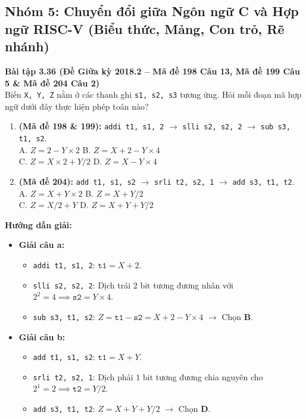 \subsection{Nhóm 5: Chuyển đổi giữa Ngôn ngữ C và Hợp ngữ RISC-V (Biểu thức, Mảng, Con trỏ, Rẽ nhánh)}

\textbf{Bài tập 3.36 (Đề Giữa kỳ 2018.2 -- Mã đề 198 Câu 13, Mã đề 199 Câu 5 \& Mã đề 204 Câu 2)}\\
Biến \texttt{X, Y, Z} nằm ở các thanh ghi \texttt{s1, s2, s3} tương ứng. Hỏi mỗi đoạn mã hợp ngữ dưới đây thực hiện phép toán nào?
\begin{enumerate}[label=\alph*)]
    \item \textbf{(Mã đề 198 \& 199):} \texttt{addi t1, s1, 2} $\rightarrow$ \texttt{slli s2, s2, 2} $\rightarrow$ \texttt{sub s3, t1, s2}.\\
    A. $Z = 2 - Y \times 2$ \qquad B. $Z = X + 2 - Y \times 4$\\
    C. $Z = X \times 2 + Y / 2$ \qquad D. $Z = X - Y \times 4$
    \item \textbf{(Mã đề 204):} \texttt{add t1, s1, s2} $\rightarrow$ \texttt{srli t2, s2, 1} $\rightarrow$ \texttt{add s3, t1, t2}.\\
    A. $Z = X + Y \times 2$ \qquad B. $Z = X + Y / 2$\\
    C. $Z = X / 2 + Y$ \qquad D. $Z = X + Y + Y / 2$
\end{enumerate}
\textbf{Hướng dẫn giải:}
\begin{itemize}
    \item \textbf{Giải câu a:}
    \begin{itemize}
        \item \texttt{addi t1, s1, 2}: $\texttt{t1} = X + 2$.
        \item \texttt{slli s2, s2, 2}: Dịch trái $2\text{ bit}$ tương đương nhân với $2^2 = 4 \implies \texttt{s2} = Y \times 4$.
        \item \texttt{sub s3, t1, s2}: $Z = \texttt{t1} - \texttt{s2} = X + 2 - Y \times 4$ $\rightarrow$ Chọn \textbf{B}.
    \end{itemize}
    \item \textbf{Giải câu b:}
    \begin{itemize}
        \item \texttt{add t1, s1, s2}: $\texttt{t1} = X + Y$.
        \item \texttt{srli t2, s2, 1}: Dịch phải $1\text{ bit}$ tương đương chia nguyên cho $2^1 = 2 \implies \texttt{t2} = Y / 2$.
        \item \texttt{add s3, t1, t2}: $Z = X + Y + Y / 2$ $\rightarrow$ Chọn \textbf{D}.
    \end{itemize}
\end{itemize}

